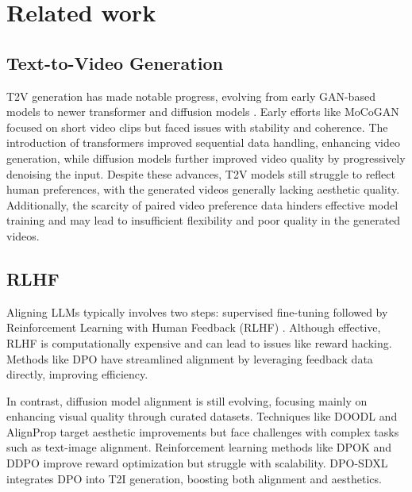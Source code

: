 \section{Related work}
\label{sec:formatting}

\subsection{Text-to-Video Generation}

T2V generation has made notable progress, evolving from early GAN-based models \cite{saito2017temporal,tulyakov2018mocogan,fu2023tell,li2018video,wu2022nuwa,yu2022generating} to newer transformer \cite{yan2021videogpt,arnab2021vivit,esser2021taming,ramesh2021zero,yu2022scaling} and diffusion models \cite{kirkpatrick2017overcoming,sohl2015deep,song2020denoising,zhang2022gddim}. Early efforts like MoCoGAN~\cite{tulyakov2018mocogan} focused on short video clips but faced issues with stability and coherence. The introduction of transformers improved sequential data handling, enhancing video generation, while diffusion models further improved video quality by progressively denoising the input. 
Despite these advances, T2V models still struggle to reflect human preferences, with the generated videos generally lacking aesthetic quality. Additionally, the scarcity of paired video preference data hinders effective model training and may lead to insufficient flexibility and poor quality in the generated videos.


\subsection{RLHF}

\iffalse
Aligning LLMs \cite{dai1901transformer,radford2019language,zhang2023opt} typically involves two steps: supervised fine-tuning followed by Reinforcement Learning with Human Feedback (RLHF) \cite{gao2023scaling,stiennon2020learning,rafailov2024direct}. Although effective, RLHF is computationally expensive and can lead to issues like reward hacking. Methods like DPO have streamlined alignment by leveraging feedback data directly, improving efficiency.

In contrast, diffusion model alignment is still evolving, focusing mainly on enhancing visual quality through curated datasets. Techniques like DOODL \cite{wallace2023end} and AlignProp \cite{prabhudesai2023aligning} target aesthetic improvements but face challenges with complex tasks such as text-image alignment. Reinforcement learning methods like DPOK \cite{fan2024reinforcement} and DDPO \cite{black2023training} improve reward optimization but struggle with scalability. DPO-SDXL integrates DPO into T2I generation, boosting both alignment and aesthetics.

